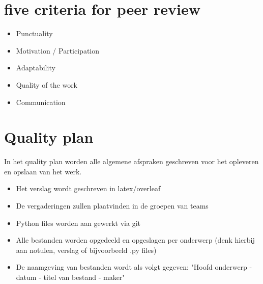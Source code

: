 \documentclass{article}
\begin{document}
\section*{five criteria for peer review}
    \begin{itemize}
       \item Punctuality
       \item Motivation / Participation
        \item Adaptability
        \item Quality of the work 
        \item Communication
    \end{itemize}



\section*{Quality plan}
In het quality plan worden alle algemene afspraken geschreven voor het opleveren en opslaan van het werk.

\begin{itemize}
    \item Het verslag wordt geschreven in latex/overleaf
    \item De vergaderingen zullen plaatvinden in de groepen van teams
    \item Python files worden aan gewerkt via git
    \item Alle bestanden worden opgedeeld en opgeslagen per onderwerp (denk hierbij aan notulen, verslag of bijvoorbeeld .py files)
    \item De naamgeving van bestanden wordt als volgt gegeven: "Hoofd onderwerp - datum - titel van bestand - maker"

\end{itemize}
\end{document}
